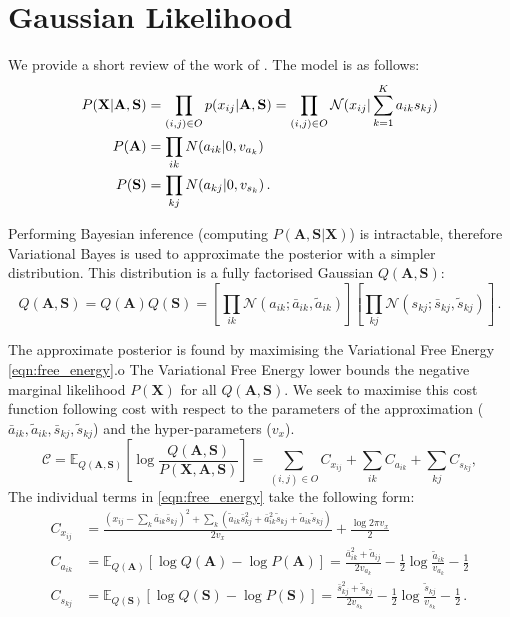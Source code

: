 \documentclass{article}
\newcommand{\obs}{O}
\newcommand{\X}{\mathbf{X}}
\newcommand{\A}{\mathbf{A}}
\newcommand{\s}{\mathbf{S}}
\newcommand{\N}{\mathcal{N}}
\newcommand{\atil}{\tilde{a}}
\newcommand{\abar}{\bar{a}}
\newcommand{\stil}{\tilde{s}}
\newcommand{\sbar}{\bar{s}}
\newcommand{\E}{\mathbb{E}}
\begin{document}
\section{Gaussian Likelihood} \label{sec:gaussian}
We provide a short review of the work of \citep{raiko2007}. The model is as follows:
\begin{align}
P(\X|\A,\s) &= \prod_{(i,j)\in\obs} p(x_{ij}|\A,\s) = \prod_{(i,j)\in\obs} \N(x_{ij}|\sum_{k=1}^K a_{ik}s_{kj}) \notag\\
P(\A) &= \prod_{ik} N(a_{ik}|0, v_{a_k}) \notag \\
P(\s) &= \prod_{kj} N(a_{kj}|0, v_{s_k}) \notag \,.
\end{align}

Performing Bayesian inference (computing $P(\A,\s|\X)$) is intractable, therefore Variational Bayes is used to approximate the posterior with a simpler distribution.
This distribution is a fully factorised Gaussian $Q(\A,\s)$:
\begin{equation}
Q(\A,\s)=Q(\A)Q(\s)=\left[\prod_{ik}\N(a_{ik};\abar_{ik},\atil_{ik})\right]\left[\prod_{kj}\N(s_{kj};\sbar_{kj},\stil_{kj})\right]\label{eqn:var_approx}\,.
\end{equation}

The approximate posterior is found by maximising the Variational Free Energy \eqref{eqn:free_energy}.o
The Variational Free Energy lower bounds the negative marginal likelihood $P(\X)$ for all $Q(\A,\s)$.  
We seek to maximise this cost function following cost with respect to the parameters of the approximation ($\abar_{ik},\atil_{ik},\sbar_{kj},\stil_{kj}$) and the hyper-parameters ($v_x$).
\begin{equation}
\mathcal{C}=\E_{Q(\A,\s)}\left[\log\frac{Q(\A,\s)}{P(\X,\A,\s)} \right]
=\sum_{(i,j)\in\obs}C_{x_{ij}} + \sum_{ik}C_{a_{ik}} + \sum_{kj}C_{s_{kj}},
\label{eqn:free_energy}
\end{equation}
The individual terms in \eqref{eqn:free_energy} take the following form:
\begin{align}
C_{x_{ij}}&=\frac{(x_{ij} - \sum_k \abar_{ik}\sbar_{kj})^2 + \sum_k(\atil_{ik}\sbar_{kj}^2 + \abar_{ik}^2\stil_{kj} + \atil_{ik}\stil_{kj}) }{2v_x} + \frac{\log 2\pi v_x}{2} \label{eqn:lik_gauss}\\
C_{a_{ik}}&=\E_{Q(\A)}\left[\log Q(\A) -\log P(\A) \right]=\frac{\abar_{ik}^2+\atil_{ij}}{2v_{a_k}}-\frac{1}{2}\log \frac{\atil_{ik}}{v_{a_k}}-\frac{1}{2} \label{eqn:priorA} \\
C_{s_{kj}}&=\E_{Q(\s)}\left[\log Q(\s) -\log P(\s) \right]=\frac{\sbar_{kj}^2+\stil_{kj}}{2v_{s_k}}-\frac{1}{2}\log \frac{\stil_{kj}}{v_{s_k}}-\frac{1}{2} \label{eqn:priorS} \,.
\end{align}
\end{document}

